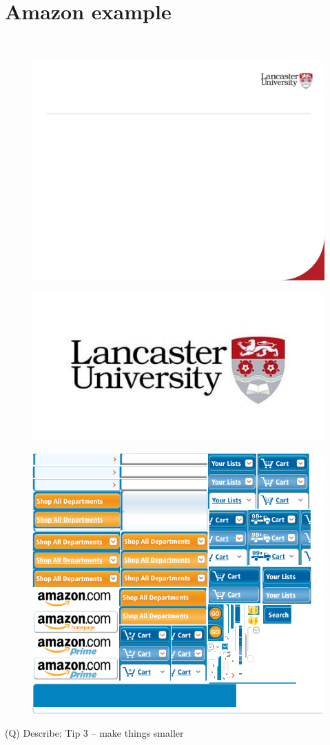 \documentclass[12pt]{article}
\begin{document}
\section{Amazon example}
\\
\begin{figure}[H]
\includegraphics[width=0.5\linewidth]{page53-image-1.png}
\end{figure}
\begin{figure}[H]
\includegraphics[width=0.5\linewidth]{page53-image-2.png}
\end{figure}
\begin{figure}[H]
\includegraphics[width=0.5\linewidth]{page53-image-3.png}
\end{figure}
\clearpage
(Q)
Describe: Tip 3 – make things smaller
\clearpage
\end{document}

